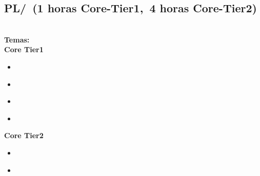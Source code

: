 \subsection{PL/\PLBasicTypeSystems~(1 horas Core-Tier1,~4 horas Core-Tier2)}\label{sec:BOK:PLBasicTypeSystems}
\PLBasicTypeSystemsDescription\\
\noindent \textbf{Temas:}\\
\noindent \textbf{Core Tier1}
\begin{itemize}
	\item \PLBasicTypeSystemsTopicA\label{sec:BOK:PLBasicTypeSystemsTopicA}
	\item \PLBasicTypeSystemsTopicAssociation\label{sec:BOK:PLBasicTypeSystemsTopicAssociation}
	\item \PLBasicTypeSystemsTopicType\label{sec:BOK:PLBasicTypeSystemsTopicType}
	\item \PLBasicTypeSystemsTopicGoals\label{sec:BOK:PLBasicTypeSystemsTopicGoals}
\end{itemize}

\noindent \textbf{Core Tier2}
\begin{itemize}
	\item \PLBasicTypeSystemsTopicGeneric\label{sec:BOK:PLBasicTypeSystemsTopicGeneric}
	\item \PLBasicTypeSystemsTopicComplementary\label{sec:BOK:PLBasicTypeSystemsTopicComplementary}
\end{itemize}


